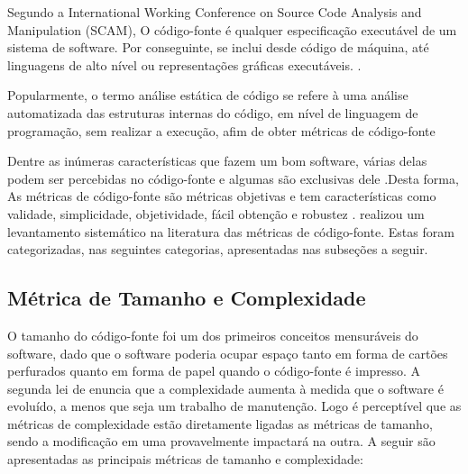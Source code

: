 Segundo a International Working Conference on Source Code Analysis and 
Manipulation (SCAM), O código-fonte é qualquer especificação executável 
de um sistema de software. Por conseguinte, se inclui desde código de máquina, 
até linguagens de alto nível ou representações gráficas executáveis. 
\cite{harman2010source}.
 
Popularmente, o termo análise estática de código se refere à uma análise 
automatizada das estruturas internas do código, 
em nível de linguagem de programação, sem realizar a execução, afim de 
obter métricas de código-fonte \cite{Terra2008} 
\cite{Emanuelsson2008} \cite{Wichmann95}  \cite{Nielson:1999} 
\cite{Sommerville10}
 
 
Dentre as inúmeras características que fazem um bom software, várias delas 
podem ser percebidas no código-fonte e algumas são exclusivas dele 
\cite{Meirelles2013}.Desta forma, As métricas de código-fonte são métricas 
objetivas e tem características como validade, simplicidade, objetividade, 
fácil obtenção e robustez \cite{Mills:1999}.  
realizou um levantamento sistemático na literatura das métricas de código-fonte. 
Estas foram categorizadas, nas seguintes categorias, apresentadas 
nas subseções a seguir. 


\subsection{Métrica de Tamanho e Complexidade}
\label{métricas tamanho e complexidade} 

O tamanho do código-fonte foi um dos primeiros conceitos mensuráveis do 
software, dado que o software poderia ocupar espaço tanto em forma de cartões 
perfurados quanto em forma de papel quando o código-fonte é impresso. 
A segunda lei de  enuncia que a complexidade aumenta à 
medida que o software é evoluído, a menos que seja um trabalho de manutenção. 
Logo é perceptível que as métricas de complexidade estão diretamente ligadas as 
métricas de tamanho, sendo a modificação em uma provavelmente impactará na 
outra. A seguir são apresentadas as principais métricas de tamanho e 
complexidade:


